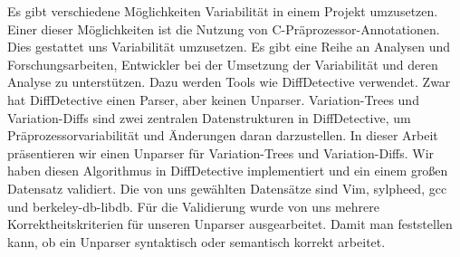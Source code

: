 Es gibt verschiedene Möglichkeiten Variabilität in einem Projekt umzusetzen. Einer dieser Möglichkeiten ist die Nutzung von C-Präprozessor-Annotationen. Dies gestattet uns Variabilität umzusetzen. Es gibt eine Reihe an Analysen und Forschungsarbeiten, Entwickler bei der Umsetzung der Variabilität und deren Analyse zu unterstützen. Dazu werden Tools wie DiffDetective verwendet. Zwar hat DiffDetective einen Parser, aber keinen Unparser. Variation-Trees und Variation-Diffs sind zwei zentralen Datenstrukturen in DiffDetective, um Präprozessorvariabilität und Änderungen daran darzustellen. In dieser Arbeit präsentieren wir einen Unparser für Variation-Trees und Variation-Diffs. Wir haben diesen Algorithmus in DiffDetective implementiert und ein einem großen Datensatz validiert. Die von uns gewählten Datensätze sind Vim, sylpheed, gcc und berkeley-db-libdb. Für die Validierung wurde von uns mehrere Korrektheitskriterien für unseren Unparser ausgearbeitet. Damit man feststellen kann, ob ein Unparser syntaktisch oder semantisch korrekt arbeitet.